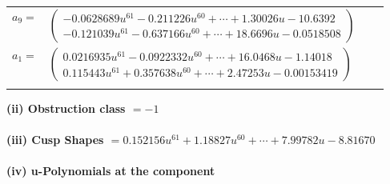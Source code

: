 \documentclass[1p]{elsarticle_modified}
\theoremstyle{definition}
\begin{document}
\begin{tabular}{m{7pt} m{180pt} m{7pt} m{180pt} }
\flushright $a_{9}=$&$\begin{pmatrix}-0.0628689 u^{61}-0.211226 u^{60}+\cdots+1.30026 u-10.6392\\-0.121039 u^{61}-0.637166 u^{60}+\cdots+18.6696 u-0.0518508\end{pmatrix}$ \\
\flushright $a_{1}=$&$\begin{pmatrix}0.0216935 u^{61}-0.0922332 u^{60}+\cdots+16.0468 u-1.14018\\0.115443 u^{61}+0.357638 u^{60}+\cdots+2.47253 u-0.00153419\end{pmatrix}$\\&\end{tabular}
\flushleft \textbf{(ii) Obstruction class $= -1$}\\~\\
\flushleft \textbf{(iii) Cusp Shapes $= 0.152156 u^{61}+1.18827 u^{60}+\cdots+7.99782 u-8.81670$}\\~\\
\newpage\renewcommand{\arraystretch}{1}
\flushleft \textbf{(iv) u-Polynomials at the component}\newline \\
\end{document}

